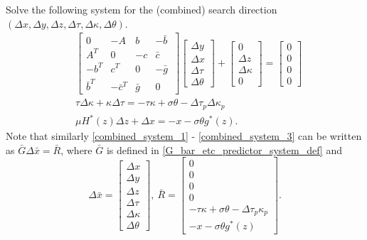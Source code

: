 \documentclass[11pt]{article}
\theoremstyle{definition}
\theoremstyle{plain}
\begin{document}
Solve the following system for the (combined) search direction $(\Delta x, \Delta y, \Delta z, \Delta \tau, \Delta \kappa, \Delta \theta)$.
\begin{align}
& \begin{bmatrix}
0 & -A & b & -\bar b\ \\ 
A^T & 0 & -c & \bar c \\
-b^T & c^T& 0 & -\bar g \\
\bar b^T & -\bar c^T & \bar g & 0
\end{bmatrix}
\begin{bmatrix}
\Delta y \\ \Delta x \\ \Delta \tau \\ \Delta \theta
\end{bmatrix} + 
\begin{bmatrix}
0 \\ \Delta z \\ \Delta \kappa \\ 0 
\end{bmatrix} = \begin{bmatrix}
0\\0\\0\\0
\end{bmatrix} \label{combined_system_1}\\[1ex]
& \tau \Delta \kappa + \kappa \Delta \tau = - \tau \kappa + \sigma \theta - \Delta \tau_p \Delta \kappa_p \label{combined_system_2}\\[1ex]
& \mu H^*(z)\Delta z + \Delta x = -x - \sigma \theta g^*(z). \label{combined_system_3}
\end{align}
Note that similarly \eqref{combined_system_1} - \eqref{combined_system_3} can be written as $\bar G \Delta \bar x = \bar R$, where $\bar G$ is defined in \eqref{G_bar_etc_predictor_system_def} and 
\[\Delta \bar x =  \begin{bmatrix}
\Delta{x}\\ \Delta{y}\\ \Delta{z}\\ \Delta{\tau}\\ \Delta{\kappa}\\ \Delta{\theta}
\end{bmatrix},\ \bar R = \begin{bmatrix}
0\\0\\0\\0\\-\tau\kappa + \sigma\theta - \Delta\tau_p\kappa_p \\[0.8ex] -x - \sigma\theta g^*(z)
	\end{bmatrix}. \]
\end{document}
